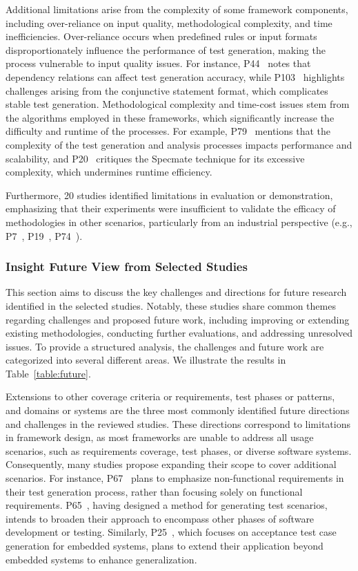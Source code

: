 Additional limitations arise from the complexity of some framework components, including over-reliance on input quality, methodological complexity, and time inefficiencies. Over-reliance occurs when predefined rules or input formats disproportionately influence the performance of test generation, making the process vulnerable to input quality issues. For instance, P44~ notes that dependency relations can affect test generation accuracy, while P103~ highlights challenges arising from the conjunctive statement format, which complicates stable test generation. Methodological complexity and time-cost issues stem from the algorithms employed in these frameworks, which significantly increase the difficulty and runtime of the processes. For example, P79~ mentions that the complexity of the test generation and analysis processes impacts performance and scalability, and P20~ critiques the Specmate technique for its excessive complexity, which undermines runtime efficiency.

Furthermore, 20 studies identified limitations in evaluation or demonstration, emphasizing that their experiments were insufficient to validate the efficacy of methodologies in other scenarios, particularly from an industrial perspective (e.g., P7~, P19~, P74~).

\subsubsection{Insight Future View from Selected Studies}

This section aims to discuss the key challenges and directions for future research identified in the selected studies. Notably, these studies share common themes regarding challenges and proposed future work, including improving or extending existing methodologies, conducting further evaluations, and addressing unresolved issues. To provide a structured analysis, the challenges and future work are categorized into several different areas. We illustrate the results in Table~\ref{table:future}.

Extensions to other coverage criteria or requirements, test phases or patterns, and domains or systems are the three most commonly identified future directions and challenges in the reviewed studies. These directions correspond to limitations in framework design, as most frameworks are unable to address all usage scenarios, such as requirements coverage, test phases, or diverse software systems. Consequently, many studies propose expanding their scope to cover additional scenarios. For instance, P67~ plans to emphasize non-functional requirements in their test generation process, rather than focusing solely on functional requirements. P65~, having designed a method for generating test scenarios, intends to broaden their approach to encompass other phases of software development or testing. Similarly, P25~, which focuses on acceptance test case generation for embedded systems, plans to extend their application beyond embedded systems to enhance generalization.

